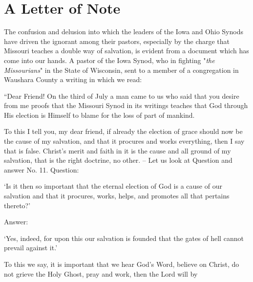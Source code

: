 \section{A Letter of Note} The confusion and delusion into which the leaders of the Iowa and Ohio Synods have driven the ignorant among their pastors, especially by the charge that Missouri teaches a double way of salvation, is evident from a document which has come into our hands. A pastor of the Iowa Synod, who in fighting "\textit{the Missourians}" in the State of Wisconsin, sent to a member of a congregation in Waushara County a writing in which we read: \begin{displayquote}``Dear Friend! On the third of July a man came to us who said that you desire from me proofs that the Missouri Synod in its writings teaches that God through His election is Himself to blame for the loss of part of mankind.\end{displayquote}  To this I tell you, my dear friend, if already the election of grace should now be the cause of my salvation, and that it procures and works everything, then I say that is false. Christ's merit and faith in it is the cause and all ground of my salvation, that is the right doctrine, no other. -- Let us look at Question and answer No. 11. Question: \begin{displayquote}`Is it then so important that the eternal election of God is a cause of our salvation and that it procures, works, helps, and promotes all that pertains thereto?' \end{displayquote} Answer: \begin{displayquote}`Yes, indeed, for upon this our salvation is founded that the gates of hell cannot prevail against it.'\end{displayquote} To this we say, it is important that we hear God's Word, believe on Christ, do not grieve the Holy Ghost, pray and work, then the Lord will by 